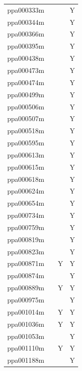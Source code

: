 \documentclass[12pt]{article}
\begin{document}
\begin{center}
\begin{longtable}{llll}
	ppa000333m & & &Y \\
	ppa000344m & & &Y \\
	ppa000366m & & &Y \\
	ppa000395m & & &Y \\
	ppa000438m & & &Y \\
	ppa000473m & & &Y \\
	ppa000474m & & &Y \\
	ppa000499m & & &Y \\
	ppa000506m & & &Y \\
	ppa000507m & & &Y \\
	ppa000518m & & &Y \\
	ppa000595m & & &Y \\
	ppa000613m & & &Y \\
	ppa000615m & & &Y \\
	ppa000618m & & &Y \\
	ppa000624m & & &Y \\
	ppa000654m & & &Y \\
	ppa000734m & & &Y \\
	ppa000759m & & &Y \\
	ppa000819m & & &Y \\
	ppa000823m & & &Y \\
	ppa000871m & &Y &Y \\
	ppa000874m & & &Y \\
	ppa000889m & &Y &Y \\
	ppa000975m & & &Y \\
	ppa001014m & &Y &Y \\
	ppa001036m & &Y &Y \\
	ppa001053m & & &Y \\
	ppa001110m & &Y &Y \\
	ppa001188m & & &Y \\
\end{longtable}
\end{center}
\end{document}
